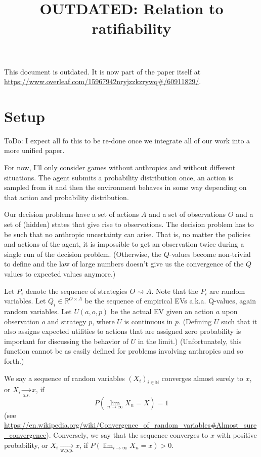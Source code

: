 \documentclass{article}
\title{OUTDATED: Relation to ratifiability}
\begin{document}
\maketitle

This document is outdated. It is now part of the paper itself at \url{https://www.overleaf.com/15967942nryjzzkzrywq#/60911829/}.

\section*{Setup}

ToDo: I expect all fo this to be re-done once we integrate all of our work into a more unified paper.

For now, I'll only consider games without anthropics and without different situations. The agent submits a probability distribution once, an action is sampled from it and then the environment behaves in some way depending on that action and probability distribution.

Our decision problems have a set of actions $A$ and a set of observations $O$ and a set of (hidden) states that give rise to observations. The decision problem has to be such that no anthropic uncertainty can arise. That is, no matter the policies and actions of the agent, it is impossible to get an observation twice during a single run of the decision problem. (Otherwise, the $Q$-values become non-trivial to define and the law of large numbers doesn't give us the convergence of the $Q$ values to expected values anymore.)

Let $P_i$ denote the sequence of strategies $O\rightsquigarrow A$. Note that the $P_i$ are random variables. Let $Q_i\in \mathbb{R}^ {O\times A}$ be the sequence of empirical EVs a.k.a. Q-values, again random variables. Let $U(a,o,p)$ be the actual EV given an action $a$ upon observation $o$ and strategy $p$, where $U$ is continuous in $p$. (Defining $U$ such that it also assigns expected utilities to actions that are assigned zero probability is important for discussing the behavior of $U$ in the limit.) (Unfortunately, this function cannot be as easily defined for problems involving anthropics and so forth.)

We say a sequence of random variables $(X_i)_{i\in\mathbb{N}}$ converges almost surely to $x$, or $X_i\underset{\text{a.s.}}{\rightarrow} x$, if
\begin{equation}
P(\lim_{n\rightarrow \infty} X_n = X) = 1
\end{equation}
(see \url{https://en.wikipedia.org/wiki/Convergence_of_random_variables#Almost_sure_convergence}). Conversely, we say that the sequence converges to $x$ with positive probability, or $X_i\underset{\text{w.p.p.}}{\rightarrow} x$, if $P(\lim_{i\rightarrow \infty } X_n = x)>0$.
\end{document}
